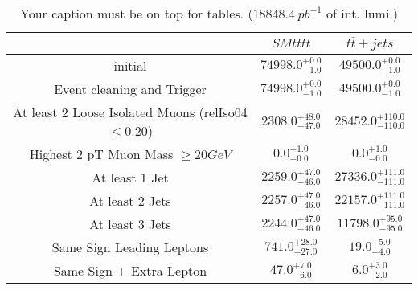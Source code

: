 \documentclass{article}
\begin{document}
\begin{table}
\caption{Your caption must be on top for tables. ($18848.4~pb^{-1}$ of int. lumi.)}
\label{tab:}
\centering
\begin{tabular}{|c|cc|}
\toprule
&$SM tttt$	&$t\bar{t}+jets$	\\

\midrule
initial&	$74998.0^{+0.0}_{-1.0}$	&$49500.0^{+0.0}_{-1.0}$	\\

Event cleaning and Trigger&	$74998.0^{+0.0}_{-1.0}$	&$49500.0^{+0.0}_{-1.0}$	\\

At least 2 Loose Isolated Muons (relIso04$\leq 0.20$)&	$2308.0^{+48.0}_{-47.0}$	&$28452.0^{+110.0}_{-110.0}$	\\

Highest 2 pT Muon Mass $\geq 20 GeV$&	$0.0^{+1.0}_{-0.0}$	&$0.0^{+1.0}_{-0.0}$	\\

At least 1  Jet&	$2259.0^{+47.0}_{-46.0}$	&$27336.0^{+111.0}_{-111.0}$	\\

At least 2 Jets&	$2257.0^{+47.0}_{-46.0}$	&$22157.0^{+111.0}_{-111.0}$	\\

At least 3 Jets&	$2244.0^{+47.0}_{-46.0}$	&$11798.0^{+95.0}_{-95.0}$	\\

Same Sign Leading Leptons&	$741.0^{+28.0}_{-27.0}$	&$19.0^{+5.0}_{-4.0}$	\\

Same Sign $+$ Extra Lepton&	$47.0^{+7.0}_{-6.0}$	&$6.0^{+3.0}_{-2.0}$	\\

\bottomrule
\end{tabular}
\end{table}
\end{document}
